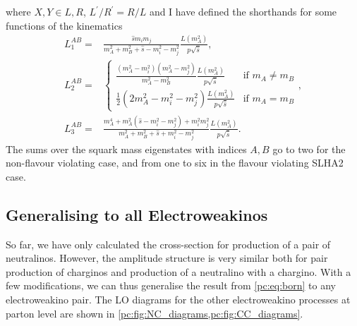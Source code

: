 \documentclass[../main.tex]{subfiles}
\begin{document}
where \(X,Y \in L,R\), \(L^\prime/R^\prime = R/L\) and I have defined the shorthands for some functions of the kinematics
\begin{subequations}
  \begin{align}
    L_1^{AB} = & \frac{\hat{s}m_i m_j}{m_A^2+m_B^2 + \hat{s} - m_i^2 - m_j^2} \frac{L(m_A^2)}{p \sqrt{\hat{s}}},                                                                                                                                                         \\
    L_2^{AB} = & \begin{cases}\frac{(m_A^2-m_i^2)(m_A^2-m_j^2)}{m_A^2-m_B^2} \frac{L(m_A^2)}{p \sqrt{\hat{s}}} & \text{if } m_A \neq m_B \\ \frac{1}{2}(2 m_A^2 - m_i^2 - m_j^2) \frac{L(m_A^2)}{p \sqrt{\hat{s}}} & \text{if } m_A = m_B \end{cases}, \\
    L_3^{AB} = & \frac{m_A^4 + m_A^2(\hat{s}-m_i^2-m_j^2) + m_i^2 m_j^2}{m_A^2+m_B^2 + \hat{s} + m_i^2 - m_j^2} \frac{L(m_A^2)}{p \sqrt{\hat{s}}}.
  \end{align}
\end{subequations}
The sums over the squark mass eigenstates with indices \(A, B\) go to two for the non-flavour violating case, and from one to six in the flavour violating SLHA2 case.


\subsection{Generalising to all Electroweakinos}
So far, we have only calculated the cross-section for production of a pair of neutralinos.
However, the amplitude structure is very similar both for pair production of charginos and production of a neutralino with a chargino.
With a few modifications, we can thus generalise the result from \cref{pc:eq:born} to any electroweakino pair.
The LO diagrams for the other electroweakino processes at parton level are shown in \cref{pc:fig:NC_diagrams,pc:fig:CC_diagrams}.

\begin{figure}[ht!]
  \centering
  \caption{}
  \label{pc:fig:NC_diagrams}
\end{figure}

\begin{figure}[ht!]
  \centering
  \caption{}
  \label{pc:fig:CC_diagrams}
\end{figure}
\end{document}
